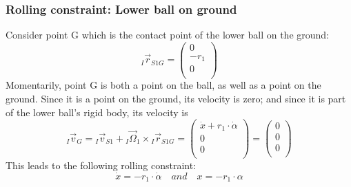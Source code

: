 \documentclass{article}
\begin{document}
\subsubsection{Rolling constraint: Lower ball on ground}
Consider point G which is the contact point of the lower ball on the ground:
\begin{equation}
{}_I \vec{r}_{S1G} =
\left( {\begin{array}{c} 0 \\ -r_1 \\ 0 \\ \end{array} } \right)
\end{equation}
Momentarily, point G is both a point on the ball, as well as a point on the ground.
Since it is a point on the ground, its velocity is zero; and since it is part of the lower ball's rigid body, its velocity is
\begin{equation}
{}_I \vec{v}_{G} = {}_I \vec{v}_{S1} + {}_I \vec{\Omega}_1 \times {}_I \vec{r}_{S1G} =
\left( {\begin{array}{c} \dot{x} + r_1 \cdot \dot{\alpha} \\ 0 \\ 0 \\ \end{array} } \right) =
\left( {\begin{array}{c} 0 \\ 0 \\ 0 \\ \end{array} } \right)
\end{equation}
This leads to the following rolling constraint:
\begin{equation}
\dot{x} = -r_1 \cdot \dot{\alpha} \quad and \quad x = -r_1 \cdot \alpha
\end{equation}
\end{document}
